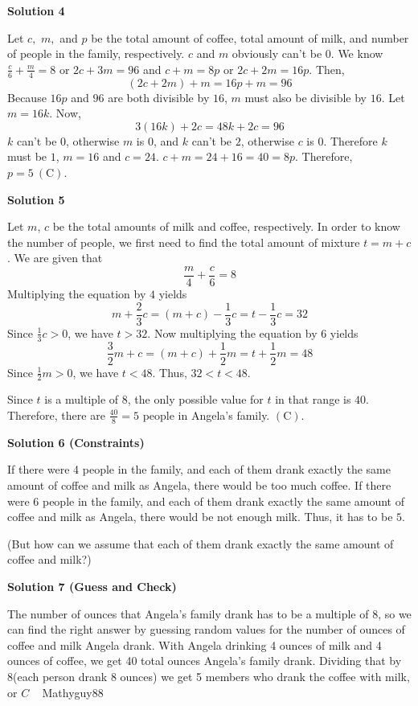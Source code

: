 \begin{enumerate}
\textbf{Solution 4}

Let $c,$ $m,$ and $p$ be the total amount of coffee, total amount of milk, and number of people in the family, respectively. $c$ and $m$ obviously can't be $0$. We know $\frac{c}{6} + \frac{m}{4} = 8$ or $2c + 3m = 96$ and $c + m = 8p$ or $2c + 2m = 16p$. Then, 
 \[(2c + 2m) + m = 16p + m = 96\]Because $16p$ and $96$ are both divisible by $16$, $m$ must also be divisible by $16$. Let $m = 16k$. Now, 
 \[3(16k) + 2c = 48k + 2c = 96\] $k$ can't be $0$, otherwise $m$ is $0$, and $k$ can't be $2$, otherwise $c$ is $0$. Therefore $k$ must be $1$, $m = 16$ and $c = 24$. $c + m = 24 + 16 = 40 = 8p$. Therefore, $p = 5\ \mathrm{(C)}$.

 



\textbf{Solution 5}

Let $m$, $c$ be the total amounts of milk and coffee, respectively. In order to know the number of people, we first need to find the total amount of mixture $t = m + c$. We are given that 
 \[\frac{m}{4} + \frac{c}{6} = 8\]Multiplying the equation by $4$ yields 
 \[m + \frac{2}{3}c = (m + c) - \frac{1}{3}c = t - \frac{1}{3}c = 32\]Since $\frac{1}{3}c > 0$, we have $t > 32$. Now multiplying the equation by $6$ yields 
 \[\frac{3}{2}m + c = (m+c) + \frac{1}{2}m = t + \frac{1}{2}m = 48\]Since $\frac{1}{2}m > 0$, we have $t < 48$. Thus, $32 < t < 48$.

 Since $t$ is a multiple of $8$, the only possible value for $t$ in that range is $40$. Therefore, there are $\frac{40}{8} = 5$ people in Angela's family. $\mathrm{(C)}$.

 



\textbf{Solution 6 (Constraints)}

If there were 4 people in the family, and each of them drank exactly the same amount of coffee and milk as Angela, there would be too much coffee. If there were 6 people in the family, and each of them drank exactly the same amount of coffee and milk as Angela, there would be not enough milk. Thus, it has to be $\boxed{5}$.

 (But how can we assume that each of them drank exactly the same amount of coffee and milk?)

 



\textbf{Solution 7 (Guess and Check)}

The number of ounces that Angela's family drank has to be a multiple of 8, so we can find the right answer by guessing random values for the number of ounces of coffee and milk Angela drank. With Angela drinking 4 ounces of milk and 4 ounces of coffee, we get 40 total ounces Angela's family drank. Dividing that by 8(each person drank 8 ounces) we get 5 members who drank the coffee with milk, or $\boxed{C}$  ~ Mathyguy88


\end{enumerate}
